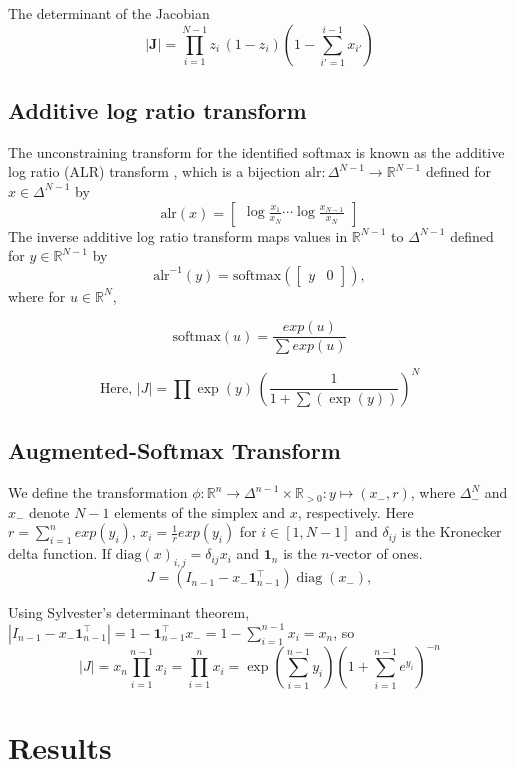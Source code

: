 \documentclass[11pt]{article}
\newcommand{\abs}[1]{\left| #1 \right|}
\begin{document}
The determinant of the Jacobian
\[
   \abs{\mathbf{J}} = \prod_{i=1}^{N-1}z_i\,(1 - z_i)\left(1 - \sum_{i'=1}^{i-1} x_{i'}\right)
\]
\subsection{Additive log ratio transform}
The unconstraining transform for the identified softmax is known as
the additive log ratio (ALR) transform
\cite{aitchison1982statistical}, which is a bijection
$\textrm{alr}:\Delta^{N-1} \rightarrow \mathbb{R}^{N-1}$ defined for
$x \in \Delta^{N-1}$ by
\[
  \textrm{alr}(x)
  = \begin{bmatrix}\displaystyle
    \log \frac{x_1}{x_N} \cdots \log \frac{x_{N-1}}{x_N}
  \end{bmatrix}
\]
The inverse additive log ratio transform maps values in
$\mathbb{R}^{N-1}$ to $\Delta^{N-1}$ defined for $y \in
\mathbb{R}^{N-1}$ by
\[
  \textrm{alr}^{-1}(y)
  = \textrm{softmax}(\begin{bmatrix} y &  0 \end{bmatrix}),
\]
where for $u \in \mathbb{R}^N$,

\[
  \textrm{softmax}(u) = \frac{exp(u)}{\sum exp(u)}
\]

\[
\textrm{Here, } \abs{J} = \prod \exp(y)
  \, \left( \frac{1}{1 + \sum(\exp(y))} \right)^N
\]
\subsection{Augmented-Softmax Transform}

We define the transformation
$\phi: \mathbb{R}^n \to \Delta^{n-1} \times \mathbb{R}_{>0}: y \mapsto
(x_-, r)$, where  $\Delta_{-}^N$ and $x_{-}$  denote $N-1$ elements of the simplex and $x$, respectively. Here $r = \sum_{i=1}^n exp(y_i)$,
$x_i = \frac{1}{r} exp(y_i)$ for $i \in [1, N-1]$ and $\delta_{ij}$ is the Kronecker delta function. If $\mathrm{diag}(x)_{i, j} = \delta_{ij} x_i$ and $\boldsymbol{1}_n$ is the $n$-vector of ones.\[
  J = (I_{n-1} - x_- \boldsymbol{1}_{n-1}^\top) \operatorname{diag}(x_-),
\] 

Using Sylvester's determinant theorem,
$|I_{n-1} - x_- \boldsymbol{1}_{n-1}^\top| = 1 -
\boldsymbol{1}_{n-1}^\top x_- = 1 - \sum_{i=1}^{n-1} x_i = x_n$, so
$$ |J| = x_n \prod_{i=1}^{n-1} x_i = \prod_{i=1}^{n} x_i = \exp\left(\sum_{i=1}^{n-1} y_i\right) \left(1 + \sum_{i=1}^{n-1} e^{y_i}\right)^{-n}$$

\section{Results}
\end{document}
